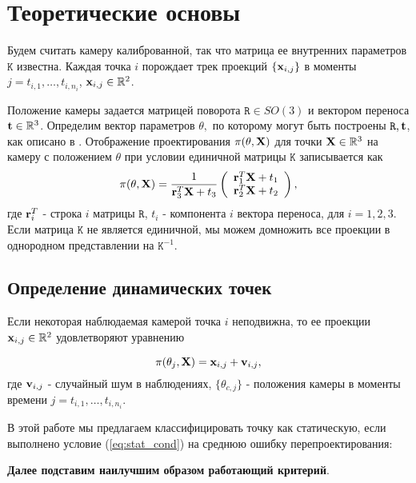 \documentclass[conference]{IEEEtran}
\begin{document}
\section{Теоретические основы}
Будем считать камеру калиброванной, так что матрица ее внутренних параметров $\mathtt{K}$ известна. Каждая точка $i$ порождает трек проекций $\{ {\bf x}_{i,j} \}$ в моменты $j = t_{i,1}, \ldots, t_{i,n_i}$, ${\bf x}_{i,j} \in \mathbb{R}^2$. 

Положение камеры задается матрицей поворота $\mathtt{R} \in SO(3)$ и вектором переноса ${\bf t} \in \mathbb{R}^3$.  Определим вектор параметров $\theta,$ по которому могут быть построены $\mathtt{R}, {\bf t}$, как описано в \cite{}. Отображение проектирования $\pi(\theta, {\bf X})$ для точки ${\bf X} \in \mathbb{R}^3$ на камеру с положением $\theta$ при условии единичной матрицы $\mathtt{K}$ записывается как
\begin{equation}\label{eq:proj_fun}
\pi(\theta, {\bf X}) = 
\frac{1}{{\bf r}_3^T {\bf X} + t_3}
\left( 
\begin{array}{c}
 {\bf r}_1^T {\bf X} + t_1 \\
{\bf r}_2^T {\bf X} + t_2
\end{array}
\right),
\end{equation}
где ${\bf r}_i^T$ - строка $i$ матрицы $\mathtt{R}$, $t_i$ - компонента $i$ вектора переноса, для $i = 1,2,3.$ Если матрица $\mathtt{K}$ не является единичной, мы можем домножить все проекции в однородном представлении на $\mathtt{K}^{-1}$.

\subsection{Определение динамических точек}
Если некоторая наблюдаемая камерой точка $i$ неподвижна, то ее проекции ${\bf x}_{i,j} \in \mathbb{R}^2$ удовлетворяют уравнению

\begin{equation}
\label{eq:proj_stat}
\pi(\theta_j, {\bf X}) = {\bf x}_{i,j} + {\bf v}_{i,j},
\end{equation}
где ${\bf v}_{i,j}$ - случайный шум в наблюдениях, $\{ \theta_{c,j} \}$ - положения камеры в моменты времени $j =t_{i,1}, \ldots, t_{i,n_i}$. 

В этой работе мы предлагаем классифицировать точку как статическую, если выполнено условие (\ref{eq:stat_cond}) на среднюю ошибку перепроектирования:

{\bf Далее подставим наилучшим образом работающий критерий}.
\end{document}
